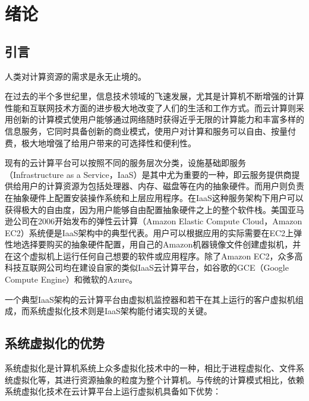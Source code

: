 
\chapter{绪论}
\label{chap:what}

\section{引言}

人类对计算资源的需求是永无止境的。

在过去的半个多世纪里，信息技术领域的飞速发展，尤其是计算机不断增强的计算性能和互联网技术方面的进步极大地改变了人们的生活和工作方式。而云计算则采用创新的计算模式使用户能够通过网络随时获得近乎无限的计算能力和丰富多样的信息服务，它同时具备创新的商业模式，使用户对计算和服务可以自由、按量付费，极大地增强了给用户带来的可选择性和便利性。

现有的云计算平台可以按照不同的服务层次分类，设施基础即服务（Infrastructure as a Service，IaaS）是其中尤为重要的一种，即云服务提供商提供给用户的计算资源为包括处理器、内存、磁盘等在内的抽象硬件。而用户则负责在抽象硬件上配置安装操作系统和上层应用程序。在IaaS这种服务架构下用户可以获得极大的自由度，因为用户能够自由配置抽象硬件之上的整个软件栈。美国亚马逊公司在2006开始发布的弹性云计算（Amazon Elastic Compute Cloud，Amazon EC2）系统便是IaaS架构中的典型代表。用户可以根据应用的实际需要在EC2上弹性地选择要购买的抽象硬件配置，用自己的Amazon机器镜像文件创建虚拟机，并在这个虚拟机上运行任何自己想要的软件或应用程序。除了Amazon EC2，众多高科技互联网公司均在建设自家的类似IaaS云计算平台，如谷歌的GCE（Google Compute Engine）和微软的Azure。

一个典型IaaS架构的云计算平台由虚拟机监控器和若干在其上运行的客户虚拟机组成，而系统虚拟化技术则是IaaS架构能付诸实现的关键。

\section{系统虚拟化的优势}

系统虚拟化是计算机系统上众多虚拟化技术中的一种，相比于进程虚拟化、文件系统虚拟化等，其进行资源抽象的粒度为整个计算机。与传统的计算模式相比，依赖系统虚拟化技术在云计算平台上运行虚拟机具备如下优势：

